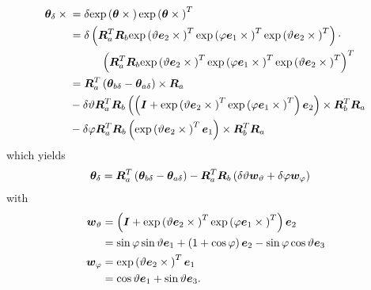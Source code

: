\documentclass[10pt,dvips,fleqn,subeqn]{report}
\newcommand{\T}[1]{\bm{#1}}
\begin{document}
\begin{align}
	\T{\theta}_{\delta}\times{}
	&= \delta \llk{exp}\plbr{\T{\theta}\times{}}
		\llk{exp}\plbr{\T{\theta}\times{}}^T \nonumber \\
	&= \delta \plbr{
		\T{R}_a^T
		\T{R}_b
		\llk{exp}\plbr{\vartheta \T{e}_2\times{}}^T
		\llk{exp}\plbr{\varphi \T{e}_1\times{}}^T
		\llk{exp}\plbr{\vartheta \T{e}_2\times{}}^T
	} \cdot \nonumber \\
	&\mbox{\hspace{10mm}} \plbr{
		\T{R}_a^T
		\T{R}_b
		\llk{exp}\plbr{\vartheta \T{e}_2\times{}}^T
		\llk{exp}\plbr{\varphi \T{e}_1\times{}}^T
		\llk{exp}\plbr{\vartheta \T{e}_2\times{}}^T
	}^T \nonumber \\
	&= \T{R}_a^T
	\plbr{\T{\theta}_{b\delta} - \T{\theta}_{a\delta}}\times{} \T{R}_a
	\nonumber \\
	& \mbox{} -
	\delta\vartheta \T{R}_a^T \T{R}_b \plbr{
		\plbr{
			\T{I}
			+ \llk{exp}\plbr{\vartheta \T{e}_2\times{}}^T
			\llk{exp}\plbr{\varphi \T{e}_1\times{}}^T
		} \T{e}_2
	}\times \T{R}_b^T \T{R}_a
	\nonumber \\
	& \mbox{} -
	\delta\varphi \T{R}_a^T \T{R}_b \plbr{
		\llk{exp}\plbr{\vartheta \T{e}_2\times{}}^T \T{e}_1
	} \times \T{R}_b^T \T{R}_a
\end{align}
which yields
\begin{align}
	\T{\theta}_{\delta}
	&= \T{R}_a^T \plbr{\T{\theta}_{b\delta} - \T{\theta}_{a\delta}}
	- \T{R}_a^T \T{R}_b \plbr{
		\delta\vartheta \T{w}_{\vartheta}
		+ \delta\varphi \T{w}_{\varphi}
	}
\end{align}
with
\begin{subequations}
\begin{align}
	\T{w}_{\vartheta}
	&= \plbr{
		\T{I}
		+ \llk{exp}\plbr{\vartheta \T{e}_2\times{}}^T
		\llk{exp}\plbr{\varphi \T{e}_1\times{}}^T
	} \T{e}_2
	\nonumber \\
	&= \sin\varphi \sin\vartheta \T{e}_1
	+ \plbr{1 + \cos\varphi} \T{e}_2
	- \sin\varphi \cos\vartheta \T{e}_3 \\
	\T{w}_{\varphi}
	&= \llk{exp}\plbr{\vartheta \T{e}_2\times{}}^T \T{e}_1
	\nonumber \\
	&= \cos\vartheta \T{e}_1 + \sin\vartheta \T{e}_3 .
\end{align}
\end{subequations}
\end{document}
